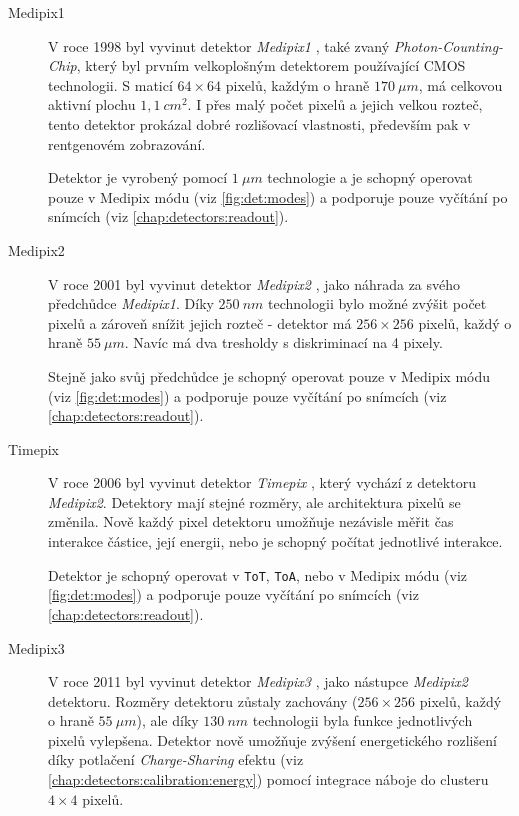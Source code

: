 \begin{description}

	\item[Medipix1] V roce 1998 byl vyvinut detektor \textit{Medipix1} \cite{medipix1}, také zvaný \textit{Photon-Counting-Chip}, který byl prvním velkoplošným detektorem používající CMOS technologii. S maticí $64\times64$ pixelů, každým o hraně $170~\mu m$, má celkovou aktivní plochu $1,1~cm^2$. I přes malý počet pixelů a jejich velkou rozteč, tento detektor prokázal dobré rozlišovací vlastnosti, především pak v rentgenovém zobrazování. 
	
	Detektor je vyrobený pomocí $1~\mu m$ technologie a je schopný operovat pouze v Medipix módu (viz \ref{fig:det:modes}) a podporuje pouze vyčítání po snímcích (viz \ref{chap:detectors:readout}).
	
	\item[Medipix2] V roce 2001 byl vyvinut detektor \textit{Medipix2} \cite{medipix2}, jako náhrada za svého předchůdce \textit{Medipix1}. Díky $250~nm$ technologii bylo možné zvýšit počet pixelů a zároveň snížit jejich rozteč - detektor má $256\times256$ pixelů, každý o hraně $55~\mu m$. Navíc má dva tresholdy s diskriminací na 4 pixely. 
	
	Stejně jako svůj předchůdce je schopný operovat pouze v Medipix módu (viz \ref{fig:det:modes}) a podporuje pouze vyčítání po snímcích (viz \ref{chap:detectors:readout}).
	
	\item[Timepix]\label{chap:detectors:medipix_overview:timepix} V roce 2006 byl vyvinut detektor \textit{Timepix} \cite{timepix}, který vychází z detektoru \textit{Medipix2}. Detektory mají stejné rozměry, ale architektura pixelů se změnila. Nově každý pixel detektoru umožňuje nezávisle měřit čas interakce částice, její energii, nebo je schopný počítat jednotlivé interakce. 
	
	Detektor je schopný operovat v \texttt{ToT}, \texttt{ToA}, nebo v Medipix módu (viz \ref{fig:det:modes}) a podporuje pouze vyčítání po snímcích (viz \ref{chap:detectors:readout}).
	
	\item[Medipix3] V roce 2011 byl vyvinut detektor \textit{Medipix3} \cite{medipix3}, jako nástupce \textit{Medipix2} detektoru. Rozměry detektoru zůstaly zachovány ($256\times256$ pixelů, každý o hraně $55~\mu m$), ale díky $130~nm$ technologii byla funkce jednotlivých pixelů vylepšena. Detektor nově umožňuje zvýšení energetického rozlišení díky potlačení \textit{Charge-Sharing} efektu (viz \ref{chap:detectors:calibration:energy}) pomocí integrace náboje do clusteru $4\times4$ pixelů. 
	

\end{description}
